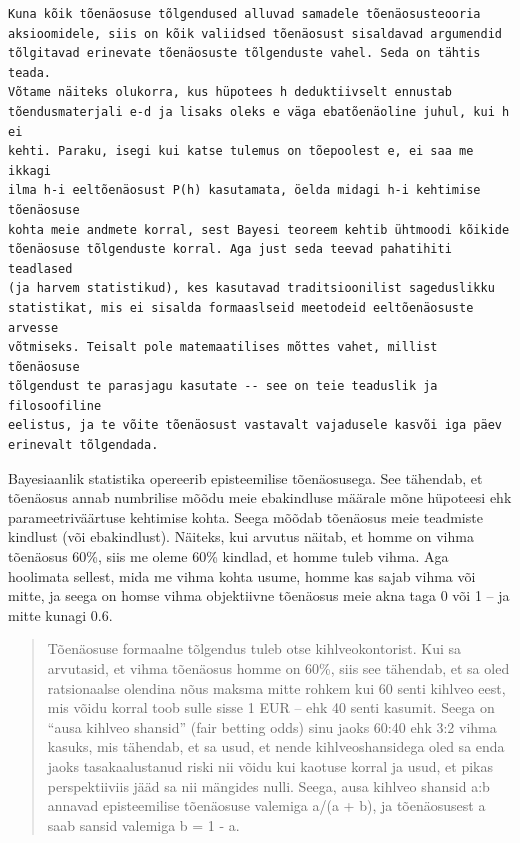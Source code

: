 \documentclass[]{book}
\begin{document}
\begin{verbatim}
Kuna kõik tõenäosuse tõlgendused alluvad samadele tõenäosusteooria 
aksioomidele, siis on kõik valiidsed tõenäosust sisaldavad argumendid 
tõlgitavad erinevate tõenäosuste tõlgenduste vahel. Seda on tähtis teada. 
Võtame näiteks olukorra, kus hüpotees h deduktiivselt ennustab 
tõendusmaterjali e-d ja lisaks oleks e väga ebatõenäoline juhul, kui h ei 
kehti. Paraku, isegi kui katse tulemus on tõepoolest e, ei saa me ikkagi 
ilma h-i eeltõenäosust P(h) kasutamata, öelda midagi h-i kehtimise tõenäosuse 
kohta meie andmete korral, sest Bayesi teoreem kehtib ühtmoodi kõikide 
tõenäosuse tõlgenduste korral. Aga just seda teevad pahatihiti teadlased 
(ja harvem statistikud), kes kasutavad traditsioonilist sageduslikku 
statistikat, mis ei sisalda formaaslseid meetodeid eeltõenäosuste arvesse 
võtmiseks. Teisalt pole matemaatilises mõttes vahet, millist tõenäosuse 
tõlgendust te parasjagu kasutate -- see on teie teaduslik ja filosoofiline 
eelistus, ja te võite tõenäosust vastavalt vajadusele kasvõi iga päev 
erinevalt tõlgendada.
\end{verbatim}

Bayesiaanlik statistika opereerib episteemilise tõenäosusega. See
tähendab, et tõenäosus annab numbrilise mõõdu meie ebakindluse määrale
mõne hüpoteesi ehk parameetriväärtuse kehtimise kohta. Seega mõõdab
tõenäosus meie teadmiste kindlust (või ebakindlust). Näiteks, kui
arvutus näitab, et homme on vihma tõenäosus 60\%, siis me oleme 60\%
kindlad, et homme tuleb vihma. Aga hoolimata sellest, mida me vihma
kohta usume, homme kas sajab vihma või mitte, ja seega on homse vihma
objektiivne tõenäosus meie akna taga 0 või 1 -- ja mitte kunagi 0.6.

\begin{quote}
Tõenäosuse formaalne tõlgendus tuleb otse kihlveokontorist. Kui sa
arvutasid, et vihma tõenäosus homme on 60\%, siis see tähendab, et sa
oled ratsionaalse olendina nõus maksma mitte rohkem kui 60 senti kihlveo
eest, mis võidu korral toob sulle sisse 1 EUR -- ehk 40 senti kasumit.
Seega on ``ausa kihlveo shansid'' (fair betting odds) sinu jaoks 60:40
ehk 3:2 vihma kasuks, mis tähendab, et sa usud, et nende
kihlveoshansidega oled sa enda jaoks tasakaalustanud riski nii võidu kui
kaotuse korral ja usud, et pikas perspektiiviis jääd sa nii mängides
nulli. Seega, ausa kihlveo shansid a:b annavad episteemilise tõenäosuse
valemiga a/(a + b), ja tõenäosusest a saab sansid valemiga b = 1 - a.
\end{quote}
\end{document}
